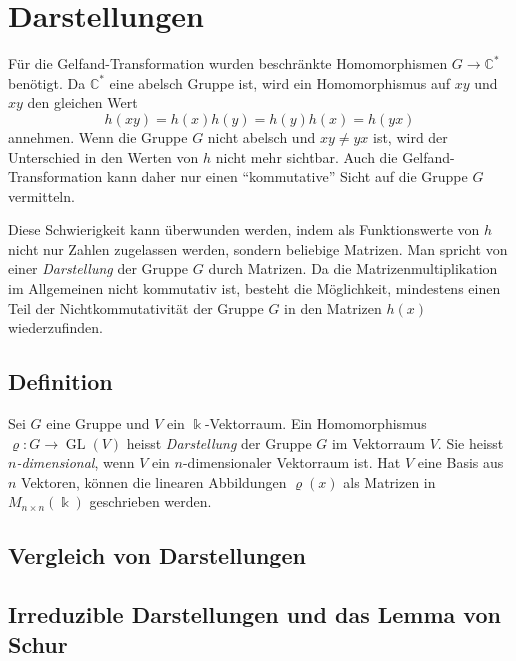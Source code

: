 %
%
%
\section{Darstellungen
\label{buch:gruppen:section:darstellung}}
Für die Gelfand-Transformation wurden beschränkte Homomorphismen
$G\to\mathbb{C}^*$ benötigt.
Da $\mathbb{C}^*$ eine abelsch Gruppe ist, wird ein Homomorphismus
auf $xy$ und $xy$ den gleichen Wert
\[
h(xy) = h(x)h(y) = h(y)h(x) = h(yx)
\]
annehmen.
Wenn die Gruppe $G$ nicht abelsch und $xy\ne yx$ ist, wird der
Unterschied in den Werten von $h$ nicht mehr sichtbar.
Auch die Gelfand-Transformation kann daher nur einen ``kommutative''
Sicht auf die Gruppe $G$ vermitteln.

Diese Schwierigkeit kann überwunden werden, indem als Funktionswerte
von $h$ nicht nur Zahlen zugelassen werden, sondern beliebige
Matrizen.
Man spricht von einer {\em Darstellung} der Gruppe $G$ durch
Matrizen.
Da die Matrizenmultiplikation im Allgemeinen nicht kommutativ
ist, besteht die Möglichkeit, mindestens einen Teil der
Nichtkommutativität der Gruppe $G$ in den Matrizen $h(x)$
wiederzufinden.

%
%
\subsection{Definition}

\begin{definition}
Sei $G$ eine Gruppe und $V$ ein $\Bbbk$-Vektorraum.
Ein Homomorphismus $\varrho\colon G\to\operatorname{GL}(V)$
heisst {\em Darstellung} der Gruppe $G$ im Vektorraum $V$.
Sie heisst {\em $n$-dimensional}, wenn $V$ ein $n$-dimensionaler
Vektorraum ist.
Hat $V$ eine Basis aus $n$ Vektoren, können die linearen
Abbildungen $\varrho(x)$ als Matrizen in $M_{n\times n}(\Bbbk)$
geschrieben werden.
\end{definition}

%
%
\subsection{Vergleich von Darstellungen}

%
%
\subsection{Irreduzible Darstellungen und das Lemma von Schur}

